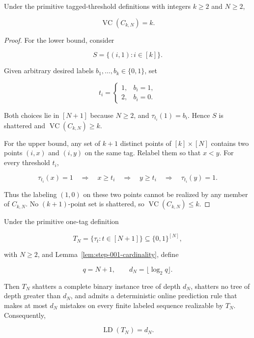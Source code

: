 \begin{lemma}\label{lem:step-001-vc}
Under the primitive tagged-threshold definitions with integers \(k\ge2\) and \(N\ge2\),

\[
\operatorname{VC}(C_{k,N})=k.
\]
\end{lemma}

\begin{proof}
For the lower bound, consider

\[
S=\{(i,1):i\in[k]\}.
\]

Given arbitrary desired labels \(b_1,\ldots,b_k\in\{0,1\}\), set

\[
t_i=\begin{cases}
1,&b_i=1,\\
2,&b_i=0.
\end{cases}
\]

Both choices lie in \([N+1]\) because \(N\ge2\), and \(\tau_{t_i}(1)=b_i\). Hence \(S\) is shattered and \(\operatorname{VC}(C_{k,N})\ge k\).

For the upper bound, any set of \(k+1\) distinct points of \([k]\times[N]\) contains two points \((i,x)\) and \((i,y)\) on the same tag. Relabel them so that \(x<y\). For every threshold \(t_i\),

\[
\tau_{t_i}(x)=1\quad\Longrightarrow\quad x\ge t_i
\quad\Longrightarrow\quad y\ge t_i
\quad\Longrightarrow\quad \tau_{t_i}(y)=1.
\]

Thus the labeling \((1,0)\) on these two points cannot be realized by any member of \(C_{k,N}\). No \((k+1)\)-point set is shattered, so \(\operatorname{VC}(C_{k,N})\le k\). \end{proof}

\begin{lemma}\label{lem:step-001-one-tag-ld}
Under the primitive one-tag definition

\[
T_N=\{\tau_t:t\in[N+1]\}\subseteq\{0,1\}^{[N]},
\]

with \(N\ge2\), and Lemma~\ref{lem:step-001-cardinality}, define

\[
q=N+1,\qquad d_N=\lfloor\log_2 q\rfloor.
\]

Then \(T_N\) shatters a complete binary instance tree of depth \(d_N\), shatters no tree of depth greater than \(d_N\), and admits a deterministic online prediction rule that makes at most \(d_N\) mistakes on every finite labeled sequence realizable by \(T_N\). Consequently,

\[
\operatorname{LD}(T_N)=d_N.
\]
\end{lemma}

